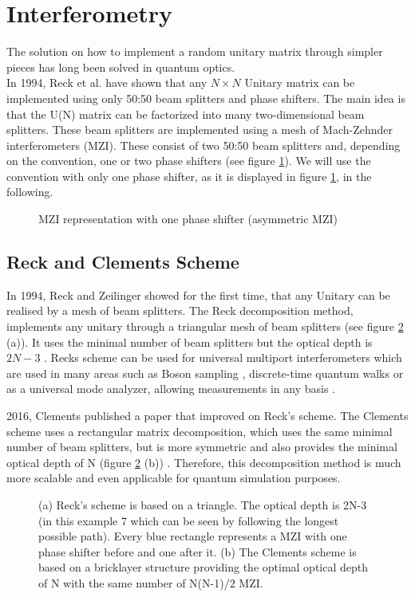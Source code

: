 \section{Interferometry}
The solution on how to implement a random unitary matrix through simpler pieces has long been solved in quantum optics. \\
In 1994, Reck et al. have shown that any $N \times N$ Unitary matrix can be implemented using only 50:50 beam splitters and phase shifters. The main idea is that the U(N) matrix can be factorized into many two-dimensional beam splitters. These beam splitters are implemented using a mesh of Mach-Zehnder interferometers (MZI). These consist of two 50:50 beam splitters and, depending on the convention, one or two phase shifters (see figure \ref{MZI}). We will use the convention with only one phase shifter, as it is displayed in figure \ref{MZI}, in the following.

\begin{figure}[t]
    \centering
    \caption[Mach-Zehnder Interferometer]{MZI representation with one phase shifter (asymmetric MZI)}
    \label{MZI}
\end{figure}

\subsection{Reck and Clements Scheme}
In 1994, Reck and Zeilinger showed for the first time, that any Unitary can be realised by a mesh of beam splitters. The Reck decomposition method, implements any unitary through a triangular mesh of beam splitters (see figure \ref{ReckClements} (a)). It uses the minimal number of beam splitters but the optical depth is $2N-3$ \cite{Reck1994}. Recks scheme can be used for universal multiport interferometers which are used in many areas such as Boson sampling \cite{Carolan_2015}, discrete-time quantum walks \cite{quantumwalk} or as a universal mode analyzer, allowing measurements in any basis \cite{Reck1994}.

2016, Clements published a paper that improved on Reck's scheme. The Clements scheme uses a rectangular matrix decomposition, which uses the same minimal number of beam splitters, but is more symmetric and also provides the minimal optical depth of N (figure \ref{ReckClements} (b)) \cite{Clements:16}. Therefore, this decomposition method is much more scalable and even applicable for quantum simulation purposes. 

\begin{figure}[t]
    \centering
    \caption[Reck and Clements Scheme]{(a) Reck's scheme is based on a triangle. The optical depth is 2N-3 (in this example 7 which can be seen by following the longest possible path). Every blue rectangle represents a MZI with one phase shifter before and one after it. (b) The Clements scheme is based on a bricklayer structure providing the optimal optical depth of N with the same number of N(N-1)/2 MZI.}
    \label{ReckClements}
\end{figure}

